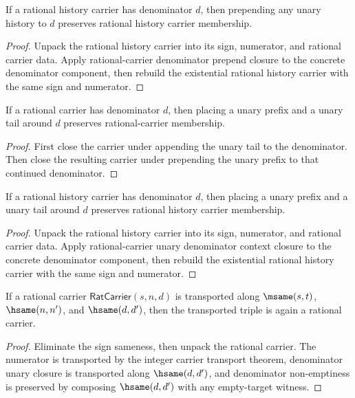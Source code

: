 \begin{theorem}
\label{thm:rat-history-carrier-prepend-unary-denominator-closed}
If a rational history carrier has denominator $d$, then prepending any unary
history to $d$ preserves rational history carrier membership.
\end{theorem}
\begin{proof}
Unpack the rational history carrier into its sign, numerator, and rational
carrier data. Apply rational-carrier denominator prepend closure to the
concrete denominator component, then rebuild the existential rational history
carrier with the same sign and numerator.
\end{proof}

\begin{theorem}
\label{thm:rat-carrier-unary-denominator-context-closed}
If a rational carrier has denominator $d$, then placing a unary prefix and a
unary tail around $d$ preserves rational-carrier membership.
\end{theorem}
\begin{proof}
First close the carrier under appending the unary tail to the denominator.
Then close the resulting carrier under prepending the unary prefix to that
continued denominator.
\end{proof}

\begin{theorem}
\label{thm:rat-history-carrier-unary-denominator-context-closed}
If a rational history carrier has denominator $d$, then placing a unary
prefix and a unary tail around $d$ preserves rational history carrier
membership.
\end{theorem}
\begin{proof}
Unpack the rational history carrier into its sign, numerator, and rational
carrier data. Apply rational-carrier unary denominator context closure to the
concrete denominator component, then rebuild the existential rational history
carrier with the same sign and numerator.
\end{proof}

\begin{theorem}
\label{thm:rat-carrier-hsame-transport}
If a rational carrier $\mathsf{RatCarrier}(s,n,d)$ is transported along
$\msame(s,t)$, $\hsame(n,n')$, and $\hsame(d,d')$, then the transported
triple is again a rational carrier.
\end{theorem}
\begin{proof}
Eliminate the sign sameness, then unpack the rational carrier. The numerator
is transported by the integer carrier transport theorem, denominator unary
closure is transported along $\hsame(d,d')$, and denominator non-emptiness is
preserved by composing $\hsame(d,d')$ with any empty-target witness.
\end{proof}
